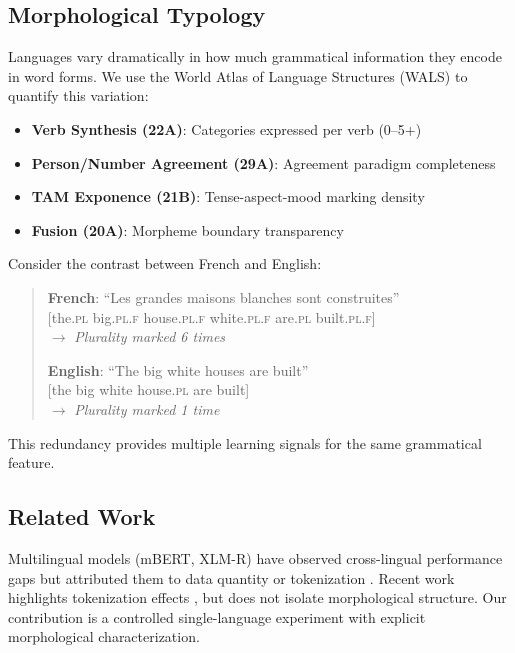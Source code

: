 \documentclass[11pt]{article}
\begin{document}
\subsection{Morphological Typology}

Languages vary dramatically in how much grammatical information they encode in word forms. We use the World Atlas of Language Structures (WALS) \citep{dryer2013wals} to quantify this variation:

\begin{itemize}
    \item \textbf{Verb Synthesis (22A)}: Categories expressed per verb (0--5+)
    \item \textbf{Person/Number Agreement (29A)}: Agreement paradigm completeness
    \item \textbf{TAM Exponence (21B)}: Tense-aspect-mood marking density
    \item \textbf{Fusion (20A)}: Morpheme boundary transparency
\end{itemize}

Consider the contrast between French and English:

\begin{quote}
\textbf{French}: ``Les grandes maisons blanches sont construites''\\
\hspace*{1cm}[the.\textsc{pl} big.\textsc{pl.f} house.\textsc{pl.f} white.\textsc{pl.f} are.\textsc{pl} built.\textsc{pl.f}]\\
\hspace*{1cm}$\rightarrow$ \textit{Plurality marked 6 times}

\textbf{English}: ``The big white houses are built''\\
\hspace*{1cm}[the big white house.\textsc{pl} are built]\\
\hspace*{1cm}$\rightarrow$ \textit{Plurality marked 1 time}
\end{quote}

This redundancy provides multiple learning signals for the same grammatical feature.

\subsection{Related Work}

Multilingual models (mBERT, XLM-R) have observed cross-lingual performance gaps but attributed them to data quantity or tokenization \citep{conneau2020unsupervised}. Recent work highlights tokenization effects \citep{rust2021good}, but does not isolate morphological structure. Our contribution is a controlled single-language experiment with explicit morphological characterization.
\end{document}
